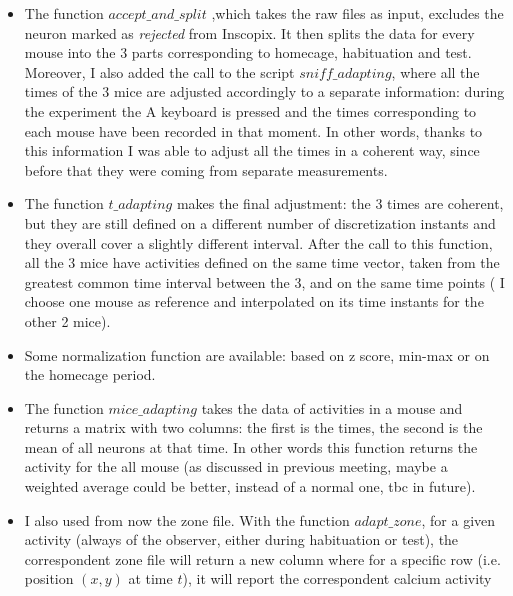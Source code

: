 \documentclass[a4paper]{article}
\begin{document}
	\begin{itemize}
		
		\item The function \textit{$accept\_and\_split$} ,which takes the raw files as input, excludes the neuron marked as \textit{rejected} from Inscopix. It then splits the data for every mouse into the 3 parts corresponding to homecage, habituation and test. Moreover, I also added the call to the script \textit{$sniff\_adapting$}, where all the times of the 3 mice are adjusted accordingly to a separate information: during the experiment the A keyboard is pressed and the times corresponding to each mouse have been recorded in that moment. In other words, thanks to this information I was able to adjust all the times in a coherent way, since before that they were coming from separate measurements.
		
		\item The function \textit{$t\_adapting$} makes the final adjustment: the 3 times are coherent, but they are still defined on a different number of discretization instants and they overall cover a slightly different interval. After the call to this function, all the 3 mice have activities defined on the same time vector, taken from the greatest common time interval between the 3, and on the same time points ( I choose one mouse as reference and interpolated on its time instants for the other 2 mice).
		
		\item Some normalization function are available: based on z score, min-max or on the homecage period.
		
		\item The function  \textit{$mice\_adapting$} takes the data of activities in a mouse and returns a matrix with two columns: the first is the times, the second is the mean of all neurons at that time. In other words this function returns the activity for the all mouse (as discussed in previous meeting, maybe a weighted average could be better, instead of a normal one, tbc in future).
		
		\item I also used from now the zone file. With the function \textit{$adapt\_zone$}, for a given activity (always of the observer, either during habituation or test), the correspondent zone file will return a new column where for a specific row (i.e. position $(x,y)$ at time $t$), it will report the correspondent calcium activity
		

\end{itemize}
\end{document}
